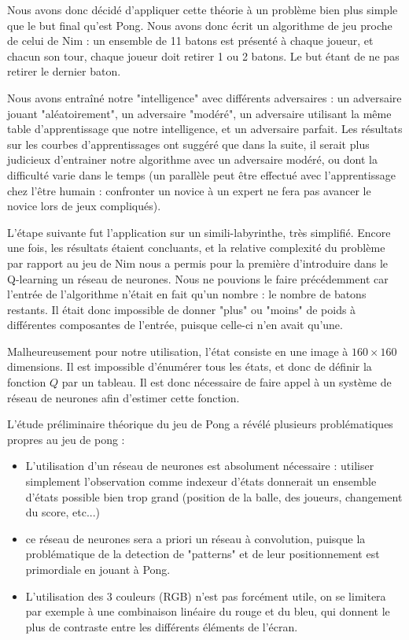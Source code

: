 \documentclass[
    10pt,
    a4paper,
    oneside,
    headinclude,footinclude,
    BCOR=5mm,
    captions=tableabove
]{scrartcl}
\begin{document}
Nous avons donc décidé d'appliquer cette théorie  à un problème bien plus simple que le but final qu'est Pong. Nous avons donc écrit un algorithme de jeu proche de celui de Nim : un ensemble de 11 batons est présenté à chaque joueur, et chacun son tour, chaque joueur doit retirer 1 ou 2 batons. Le but étant de ne pas retirer le dernier baton.

Nous avons entraîné notre "intelligence" avec différents adversaires : un adversaire jouant "aléatoirement", un adversaire "modéré", un adversaire utilisant la même table d'apprentissage que notre intelligence, et un adversaire parfait. Les résultats sur les courbes d'apprentissages ont suggéré que dans la suite, il serait plus judicieux d'entrainer notre algorithme avec un adversaire modéré, ou dont la difficulté varie dans le temps (un parallèle peut être effectué avec l'apprentissage chez l'être humain : confronter un novice à un expert ne fera pas avancer le novice lors de jeux compliqués).

L'étape suivante fut l'application sur un simili-labyrinthe, très simplifié. Encore une fois, les résultats étaient concluants, et la relative complexité du problème par rapport au jeu de Nim nous a permis pour la première d'introduire dans le Q-learning un réseau de neurones. Nous ne pouvions le faire précédemment car l'entrée de l'algorithme n'était en fait qu'un nombre : le nombre de batons restants. Il était donc impossible de donner "plus" ou "moins" de poids à différentes composantes de l'entrée, puisque celle-ci n'en avait qu'une.

Malheureusement pour notre utilisation, l'état consiste en une image à $160 \times 160$ dimensions. Il est impossible d'énumérer tous les états, et donc de définir la fonction $Q$ par un tableau. Il est donc nécessaire de faire appel à un système de réseau de neurones afin d'estimer cette fonction.


L'étude préliminaire théorique du jeu de Pong a révélé plusieurs problématiques propres au jeu de pong :
\begin{itemize}
	\item L'utilisation d'un réseau de neurones est absolument nécessaire : utiliser simplement l'observation comme indexeur d'états donnerait un ensemble d'états possible bien trop grand (position de la balle, des joueurs, changement du score, etc...)
	\item ce réseau de neurones sera a priori un réseau à convolution, puisque la problématique de la detection de "patterns" et de leur positionnement est primordiale en jouant à Pong.
	\item L'utilisation des 3 couleurs (RGB) n'est pas forcément utile, on se limitera par exemple à une combinaison linéaire du rouge et du bleu, qui donnent le plus de contraste entre les différents éléments de l'écran.
\end{itemize}
\end{document}
